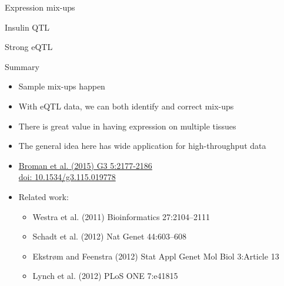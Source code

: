 \documentclass[12pt,t]{beamer}
\begin{document}
\begin{frame}[c]{Expression mix-ups}
\note{}
\end{frame}

\begin{frame}[c]{Insulin QTL}
\note{}
\end{frame}


\begin{frame}[c]{Strong eQTL}
\note{}
\end{frame}


\begin{frame}[c]{Summary}


\small
\begin{itemize}
\itemsep3pt

\item Sample mix-ups happen


\item With eQTL data, we can both identify and {\hilit correct} mix-ups

\item There is great value in having expression on multiple tissues

\item The general idea here has wide application for high-throughput data

\item \href{https://www.ncbi.nlm.nih.gov/pubmed/26290572}{Broman et
  al. (2015) G3 5:2177-2186} \\
\href{http://doi.org/10.1534/g3.115.019778}{doi: 10.1534/g3.115.019778}

\item Related work:

\begin{itemize}
\item Westra et al. (2011) Bioinformatics 27:2104--2111
\item Schadt et al. (2012) Nat Genet 44:603--608
\item Ekstr{\o}m and Feenstra (2012) Stat Appl Genet Mol Biol
  3:Article 13
\item Lynch et al. (2012) PLoS ONE 7:e41815
\end{itemize}

\end{itemize}
\note{}
\end{frame}
\end{document}
